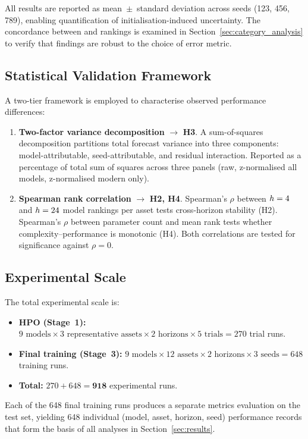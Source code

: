 All results are reported as mean~$\pm$~standard deviation across \nseeds seeds (123, 456, 789), enabling quantification of initialisation-induced uncertainty.  The concordance between \rmse and \mae rankings is examined in Section~\ref{sec:category_analysis} to verify that findings are robust to the choice of error metric.

\subsection{Statistical Validation Framework}
\label{sec:statistical_framework}

A two-tier framework is employed to characterise observed performance differences:

\begin{enumerate}[nosep]
  \item \textbf{Two-factor variance decomposition} $\rightarrow$ \textbf{H3}.  A sum-of-squares decomposition partitions total forecast variance into three components: model-attributable, seed-attributable, and residual interaction.  Reported as a percentage of total sum of squares across three panels (raw, z-normalised all models, z-normalised modern only).

  \item \textbf{Spearman rank correlation} $\rightarrow$ \textbf{H2, H4}.  Spearman's $\rho$ between $h=4$ and $h=24$ model rankings per asset tests cross-horizon stability (H2).  Spearman's $\rho$ between parameter count and mean \rmse rank tests whether complexity--performance is monotonic (H4).  Both correlations are tested for significance against $\rho = 0$.
\end{enumerate}

\subsection{Experimental Scale}
\label{sec:experimental_scale}

The total experimental scale is:

\begin{itemize}[nosep]
  \item \textbf{HPO (Stage~1):} $9 \text{ models} \times 3 \text{ representative assets} \times 2 \text{ horizons} \times 5 \text{ trials} = 270$ trial runs.
  \item \textbf{Final training (Stage~3):} $9 \text{ models} \times 12 \text{ assets} \times 2 \text{ horizons} \times 3 \text{ seeds} = 648$ training runs.
  \item \textbf{Total:} $270 + 648 = \mathbf{918}$ experimental runs.
\end{itemize}

Each of the 648 final training runs produces a separate metrics evaluation on the test set, yielding 648 individual (model, asset, horizon, seed) performance records that form the basis of all analyses in Section~\ref{sec:results}.

